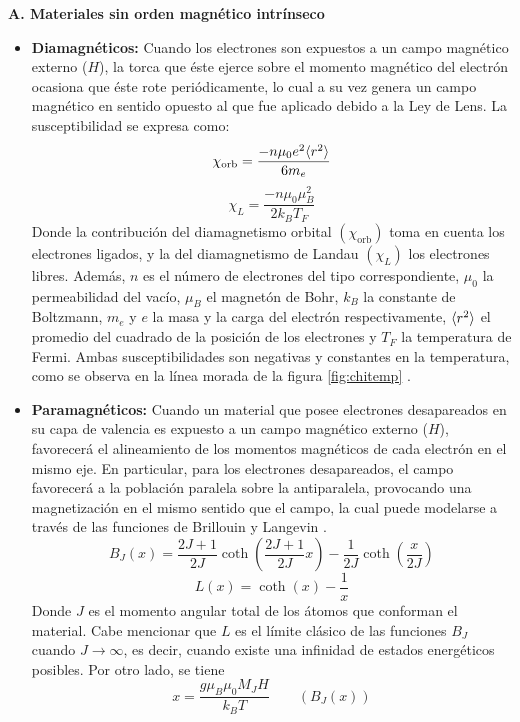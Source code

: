 \documentclass[../main.tex]{subfiles}
\begin{document}
\textbf{A. Materiales sin orden magnético intrínseco}
\begin{itemize}
    \item \textbf{Diamagnéticos:} Cuando los electrones son expuestos a un campo magnético externo ($H$), la torca que éste ejerce sobre el momento magnético del electrón ocasiona que éste rote periódicamente, lo cual a su vez genera un campo magnético en sentido opuesto al que fue aplicado debido a la Ley de Lens. La susceptibilidad se expresa como:
    \begin{equation}
        \chi_{\text{orb}}=\dfrac{-n\mu_0e^2\langle r^2 \rangle}{6m_e}
        \label{eq:chidiamagorb}
    \end{equation}
    \begin{equation}
        \chi_L=\dfrac{-n\mu_0\mu_B^2}{2k_BT_F}
        \label{eq:chidiamaglandau}
    \end{equation}
    Donde la contribución del diamagnetismo orbital $(\chi_\text{orb})$ toma en cuenta los electrones ligados, y la del diamagnetismo de Landau $(\chi_L)$ los electrones libres. Además, $n$ es el número de electrones del tipo correspondiente, $\mu_0$ la permeabilidad del vacío, $\mu_B$ el magnetón de Bohr, $k_B$ la constante de Boltzmann, $m_e$ y $e$ la masa y la carga del electrón respectivamente, $\langle r^2 \rangle$ el promedio del cuadrado de la posición de los electrones y $T_F$ la temperatura de Fermi. Ambas susceptibilidades son negativas y constantes en la temperatura, como se observa en la línea morada de la figura \ref{fig:chitemp} \cite{coey2010magnetism}.
    \item \textbf{Paramagnéticos:} Cuando un material que posee electrones desapareados en su capa de valencia es expuesto a un campo magnético externo ($H$), favorecerá el alineamiento de los momentos magnéticos de cada electrón en el mismo eje. En particular, para los electrones desapareados, el campo favorecerá a la población paralela sobre la antiparalela, provocando una magnetización en el mismo sentido que el campo, la cual puede modelarse a través de las funciones de Brillouin y Langevin \cite{coey2010magnetism}.
    \begin{equation}
        B_J(x)=\dfrac{2J+1}{2J}\coth\left(\dfrac{2J+1}{2J}x\right)-\dfrac{1}{2J}\coth\left(\dfrac{x}{2J}\right)
        \label{eq:Brillouin}
    \end{equation}
    \begin{equation}
        L(x)=\coth(x)-\dfrac{1}{x}
        \label{eq:Langevin}
    \end{equation}
    Donde $J$ es el momento angular total de los átomos que conforman el material. Cabe mencionar que $L$ es el límite clásico de las funciones $B_J$ cuando $J\rightarrow\infty$, es decir, cuando existe una infinidad de estados energéticos posibles. Por otro lado, se tiene
    \begin{equation}
        x=\dfrac{g\mu_B\mu_0M_JH}{k_BT}\qquad (B_J(x))
        \label{eq:xBrillouin}
    \end{equation}
    

\end{itemize}
\end{document}
